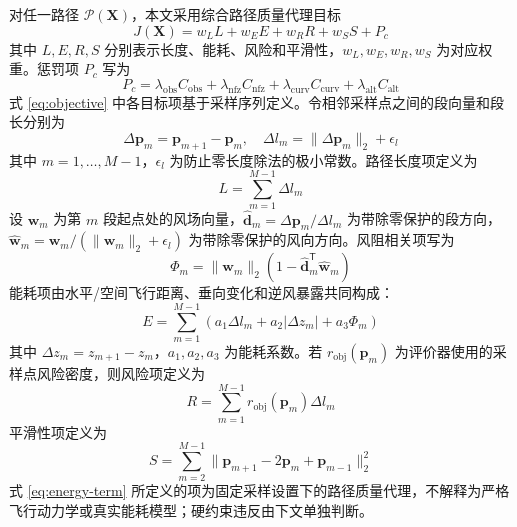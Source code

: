 对任一路径 $\mathcal{P}(\mathbf{X})$，本文采用综合路径质量代理目标
\begin{equation}
    J(\mathbf{X}) =
    w_L L + w_E E + w_R R + w_S S + P_c
    \label{eq:objective}
\end{equation}
其中 $L,E,R,S$ 分别表示长度、能耗、风险和平滑性，$w_L,w_E,w_R,w_S$ 为对应权重。惩罚项 $P_c$ 写为
\begin{equation}
    P_c = \lambda_{\mathrm{obs}} C_{\mathrm{obs}}
    + \lambda_{\mathrm{nfz}} C_{\mathrm{nfz}}
    + \lambda_{\mathrm{curv}} C_{\mathrm{curv}}
    + \lambda_{\mathrm{alt}} C_{\mathrm{alt}}
    \label{eq:penalty}
\end{equation}
式 \eqref{eq:objective} 中各目标项基于采样序列定义。令相邻采样点之间的段向量和段长分别为
\begin{equation}
    \Delta \mathbf{p}_m=\mathbf{p}_{m+1}-\mathbf{p}_m,\quad
    \Delta l_m=\|\Delta \mathbf{p}_m\|_2+\epsilon_l
    \label{eq:segment-definition}
\end{equation}
其中 $m=1,\ldots,M-1$，$\epsilon_l$ 为防止零长度除法的极小常数。路径长度项定义为
\begin{equation}
    L=\sum_{m=1}^{M-1}\Delta l_m
    \label{eq:length-term}
\end{equation}
设 $\mathbf{w}_m$ 为第 $m$ 段起点处的风场向量，$\widehat{\mathbf d}_m=\Delta\mathbf p_m/\Delta l_m$ 为带除零保护的段方向，$\widehat{\mathbf w}_m=\mathbf w_m/(\|\mathbf w_m\|_2+\epsilon_l)$ 为带除零保护的风向方向。风阻相关项写为
\begin{equation}
    \Phi_m=\|\mathbf w_m\|_2
    \left(1-\widehat{\mathbf d}_m^\mathsf{T}\widehat{\mathbf w}_m\right)
    \label{eq:wind-alignment}
\end{equation}
能耗项由水平/空间飞行距离、垂向变化和逆风暴露共同构成：
\begin{equation}
    E=\sum_{m=1}^{M-1}
    \left(
    a_1\Delta l_m+a_2|\Delta z_m|+a_3\Phi_m
    \right)
    \label{eq:energy-term}
\end{equation}
其中 $\Delta z_m=z_{m+1}-z_m$，$a_1,a_2,a_3$ 为能耗系数。若 $r_{\mathrm{obj}}(\mathbf p_m)$ 为评价器使用的采样点风险密度，则风险项定义为
\begin{equation}
    R=\sum_{m=1}^{M-1}r_{\mathrm{obj}}(\mathbf p_m)\Delta l_m
    \label{eq:risk-term}
\end{equation}
平滑性项定义为
\begin{equation}
    S=\sum_{m=2}^{M-1}\|\mathbf p_{m+1}-2\mathbf p_m+\mathbf p_{m-1}\|_2^2
    \label{eq:smoothness-term}
\end{equation}
式 \eqref{eq:energy-term} 所定义的项为固定采样设置下的路径质量代理，不解释为严格飞行动力学或真实能耗模型；硬约束违反由下文单独判断。

